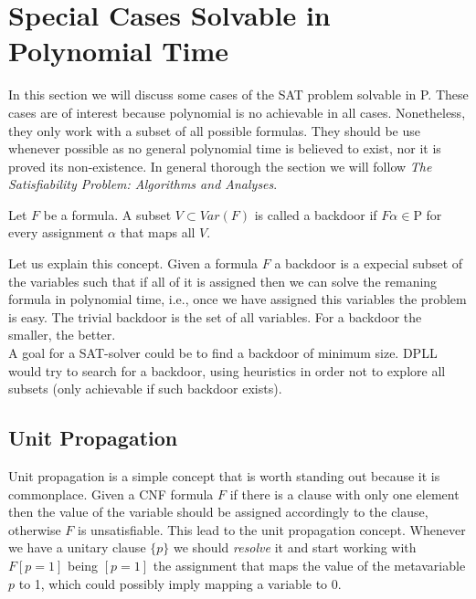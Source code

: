 
\section{Special Cases Solvable in Polynomial Time}

In this section we will discuss some cases of the SAT problem solvable in P. These cases are of interest because polynomial is no achievable in all cases. Nonetheless, they only work with a subset of all possible formulas. They should be use whenever possible as no general polynomial time is believed to exist, nor it is proved its non-existence. In general thorough the section we will follow \emph{The Satisfiability Problem: Algorithms and Analyses}\cite{schoning2013satisfiability}.

\begin{definition}
  Let $F$ be a formula. A subset $ V \subset Var(F)$ is called a backdoor if $F\alpha \in \text{P}$ for every assignment $\alpha$ that maps all $V$.
\end{definition}

Let us explain this concept. Given a formula $F$ a backdoor is a expecial subset of the variables such that if all of it is assigned then we can solve the remaning formula in polynomial time, i.e., once we have assigned this variables the problem is easy. The trivial backdoor is the set of all variables. For a backdoor the smaller, the better.\\


A goal for a SAT-solver could be to find a backdoor of minimum size. DPLL would try to search for a backdoor, using heuristics in order not to explore all subsets (only achievable if such backdoor exists).

\subsection{Unit Propagation}

Unit propagation is a simple concept that is worth standing out because it is commonplace. Given a CNF formula $F$ if there is a clause with only one element then the value of the variable should be assigned accordingly to the clause, otherwise $F$ is unsatisfiable. This lead to the unit propagation concept. Whenever we have a unitary clause $\{p\}$ we should \emph{resolve} it and start working with $F[p=1]$ being $[p=1]$ the assignment that maps the value of the metavariable $p$ to 1, which could possibly imply mapping a variable to $0$.  \\

